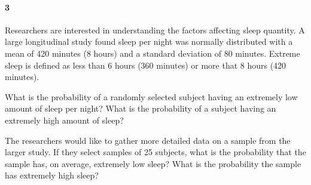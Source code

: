 \documentclass{article}
\begin{document}
\begin{flushleft}
\paragraph{3} Researchers are interested in understanding the factors affecting sleep quantity. A large longitudinal study found sleep per night was normally distributed with a mean of 420 minutes (8 hours) and a standard deviation of 80 minutes. Extreme sleep is defined as less than 6 hours (360 minutes) or more that 8 hours (420 minutes).
\begin{enumalpha}
\item What is the probability of a randomly selected subject having an extremely low amount of sleep per night? What is the probability of a subject having an extremely high amount of sleep?

\vspace{3.25in}
\item The researchers would like to gather more detailed data on a sample from the larger study. If they select samples of 25 subjects, what is the probability that the sample has, on average, extremely low sleep? What is the probability the sample has extremely high sleep?
\end{enumalpha}


\end{flushleft}
\end{document}
